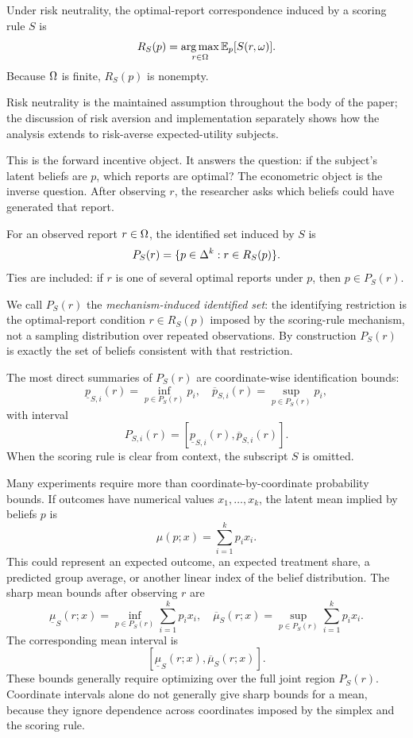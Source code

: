\begin{definition}
Under risk neutrality, the optimal-report correspondence induced by a scoring rule \(S\) is
\[
R_S(p)
=
\operatorname*{arg\,max}_{r\in\Omega}\mathbb{E}_p[S(r,\omega)].
\]
Because \(\Omega\) is finite, \(R_S(p)\) is nonempty.
\end{definition}

Risk neutrality is the maintained assumption throughout the body of the paper; the discussion of risk aversion and implementation separately shows how the analysis extends to risk-averse expected-utility subjects.

This is the forward incentive object.
It answers the question: if the subject's latent beliefs are \(p\), which reports are optimal?
The econometric object is the inverse question.
After observing \(r\), the researcher asks which beliefs could have generated that report.

\begin{definition}
For an observed report \(r\in\Omega\), the identified set induced by \(S\) is
\[
P_S(r)
=
\{p\in\Delta^k:r\in R_S(p)\}.
\]
Ties are included: if \(r\) is one of several optimal reports under \(p\), then \(p\in P_S(r)\).
\end{definition}

We call \(P_S(r)\) the \emph{mechanism-induced identified set}: the identifying restriction is the optimal-report condition \(r\in R_S(p)\) imposed by the scoring-rule mechanism, not a sampling distribution over repeated observations. By construction \(P_S(r)\) is exactly the set of beliefs consistent with that restriction.

The most direct summaries of \(P_S(r)\) are coordinate-wise identification bounds:
\[
\underline p_{S,i}(r)
=
\inf_{p\in P_S(r)}p_i,
\quad
\overline p_{S,i}(r)
=
\sup_{p\in P_S(r)}p_i,
\]
with interval
\[
P_{S,i}(r)
=
[\underline p_{S,i}(r),\overline p_{S,i}(r)].
\]
When the scoring rule is clear from context, the subscript \(S\) is omitted.

Many experiments require more than coordinate-by-coordinate probability bounds.
If outcomes have numerical values \(x_1,\ldots,x_k\), the latent mean implied by beliefs \(p\) is
\[
\mu(p;x)=\sum_{i=1}^k p_i x_i.
\]
This could represent an expected outcome, an expected treatment share, a predicted group average, or another linear index of the belief distribution.
The sharp mean bounds after observing \(r\) are
\[
\underline\mu_S(r;x)
=
\inf_{p\in P_S(r)}\sum_{i=1}^k p_i x_i,
\quad
\overline\mu_S(r;x)
=
\sup_{p\in P_S(r)}\sum_{i=1}^k p_i x_i.
\]
The corresponding mean interval is
\[
[\underline\mu_S(r;x),\overline\mu_S(r;x)].
\]
These bounds generally require optimizing over the full joint region \(P_S(r)\).
Coordinate intervals alone do not generally give sharp bounds for a mean, because they ignore dependence across coordinates imposed by the simplex and the scoring rule.


